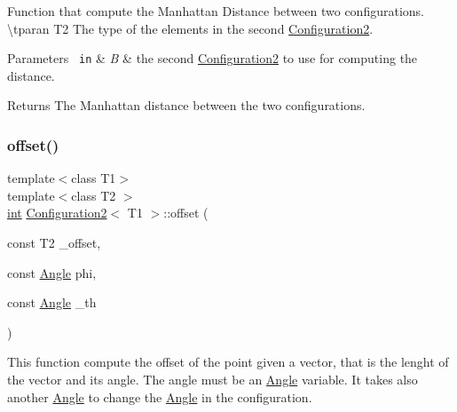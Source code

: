 Function that compute the Manhattan Distance between two configurations. \textbackslash{}tparan T2 The type of the elements in the second {\ttfamily \mbox{\hyperlink{class_configuration2}{Configuration2}}}. 


\begin{DoxyParams}[1]{Parameters}
\mbox{\texttt{ in}}  & {\em B} & the second {\ttfamily \mbox{\hyperlink{class_configuration2}{Configuration2}}} to use for computing the distance. \\
\hline
\end{DoxyParams}
\begin{DoxyReturn}{Returns}
The Manhattan distance between the two configurations. 
\end{DoxyReturn}
\mbox{\label{class_configuration2_a4c3bb49ce67ceb4b1b492cb7c093ea8c}} 
\subsubsection{\texorpdfstring{offset()}{offset()}\hspace{0.1cm}{\footnotesize\ttfamily [1/3]}}
{\footnotesize\ttfamily template$<$class T1$>$ \\
template$<$class T2 $>$ \\
\mbox{\hyperlink{draw_8hh_aa620a13339ac3a1177c86edc549fda9b}{int}} \mbox{\hyperlink{class_configuration2}{Configuration2}}$<$ T1 $>$\+::offset (\begin{DoxyParamCaption}\item[{const T2}]{\+\_\+offset,  }\item[{const \mbox{\hyperlink{class_angle}{Angle}}}]{phi,  }\item[{const \mbox{\hyperlink{class_angle}{Angle}}}]{\+\_\+th }\end{DoxyParamCaption})\hspace{0.3cm}{\ttfamily [inline]}}



This function compute the offset of the point given a vector, that is the lenght of the vector and its angle. The angle must be an {\ttfamily \mbox{\hyperlink{class_angle}{Angle}}} variable. It takes also another {\ttfamily \mbox{\hyperlink{class_angle}{Angle}}} to change the {\ttfamily \mbox{\hyperlink{class_angle}{Angle}}} in the configuration. 


